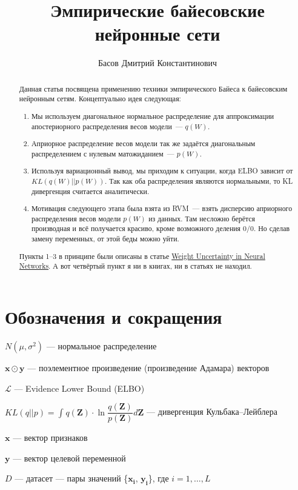 \documentclass{article}
\title{Эмпирические байесовские нейронные сети}
\author{Басов Дмитрий Константинович}
\date{}
\begin{document}
\maketitle

\begin{abstract}

Данная статья посвящена применению техники эмпирического Байеса к байесовским нейронным сетям. Концептуально идея следующая:
\begin{enumerate}
 \item Мы используем диагональное нормальное распределение для аппроксимации апостериорного распределения весов модели~--- $q(W)$.
 \item Априорное распределение весов модели так же задаётся диагональным распределением с нулевым матожиданием~--- $p(W)$.
 \item Используя вариационный вывод, мы приходим к ситуации, когда ELBO зависит от $KL(q(W) || p(W))$. Так как оба распределения являются нормальными, то KL дивергенция считается аналитически.
 \item Мотивация следующего этапа была взята из RVM~--- взять дисперсию априорного распределения весов модели $p(W)$ из данных. Там несложно берётся производная и всё получается красиво, кроме возможного деления 0/0. Но сделав замену переменных, от этой беды можно уйти.
\end{enumerate}
Пункты 1--3 в принципе были описаны в статье \href{https://arxiv.org/pdf/1505.05424}{Weight Uncertainty in Neural Networks}. А вот четвёртый пункт я ни в книгах, ни в статьях не находил.

\end{abstract}


\section{Обозначения и сокращения}
$N(\mu, \sigma^2)$ --- нормальное распределение

$\mathbf{x} \odot \mathbf{y}$ --- поэлементное произведение (произведение Адамара) векторов

$\mathcal{L}$ --- Evidence Lower Bound (ELBO)

$KL(q || p) = \int_{}{} q(\mathbf{Z}) \cdot \ln{\dfrac{q(\mathbf{Z})}{p(\mathbf{Z})}} d\mathbf{Z}$ --- дивергенция Кульбака--Лейблера

$\mathbf{x}$ --- вектор признаков

$\mathbf{y}$ --- вектор целевой переменной

$D$ --- датасет --- пары значений \{$\mathbf{x_i}$, $\mathbf{y_i}$\}, где $i = 1, \dots, L$
\end{document}
